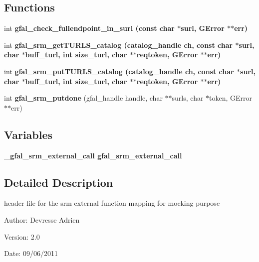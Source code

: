 \subsection*{Functions}
\begin{CompactItemize}
\item 
int \bf{gfal\_\-check\_\-fullendpoint\_\-in\_\-surl} (const char $\ast$surl, GError $\ast$$\ast$err)
\item 
int \bf{gfal\_\-srm\_\-get\-TURLS\_\-catalog} (catalog\_\-handle ch, const char $\ast$surl, char $\ast$buff\_\-turl, int size\_\-turl, char $\ast$$\ast$reqtoken, GError $\ast$$\ast$err)
\item 
int \bf{gfal\_\-srm\_\-put\-TURLS\_\-catalog} (catalog\_\-handle ch, const char $\ast$surl, char $\ast$buff\_\-turl, int size\_\-turl, char $\ast$$\ast$reqtoken, GError $\ast$$\ast$err)
\item 
int \textbf{gfal\_\-srm\_\-putdone} (gfal\_\-handle handle, char $\ast$$\ast$surls, char $\ast$token, GError $\ast$$\ast$err)\label{gfal__common__srm__internal__layer_8h_67937971ffcef75f51d9fe7a778a0374}

\end{CompactItemize}
\subsection*{Variables}
\begin{CompactItemize}
\item 
\bf{\_\-gfal\_\-srm\_\-external\_\-call} \textbf{gfal\_\-srm\_\-external\_\-call}\label{gfal__common__srm__internal__layer_8h_67b12c7342043451fc5ce31b1a3d74fb}

\end{CompactItemize}


\subsection{Detailed Description}
header file for the srm external function mapping for mocking purpose 

\begin{Desc}
\item[Author:]Devresse Adrien \end{Desc}
\begin{Desc}
\item[Version:]2.0 \end{Desc}
\begin{Desc}
\item[Date:]09/06/2011 \end{Desc}


